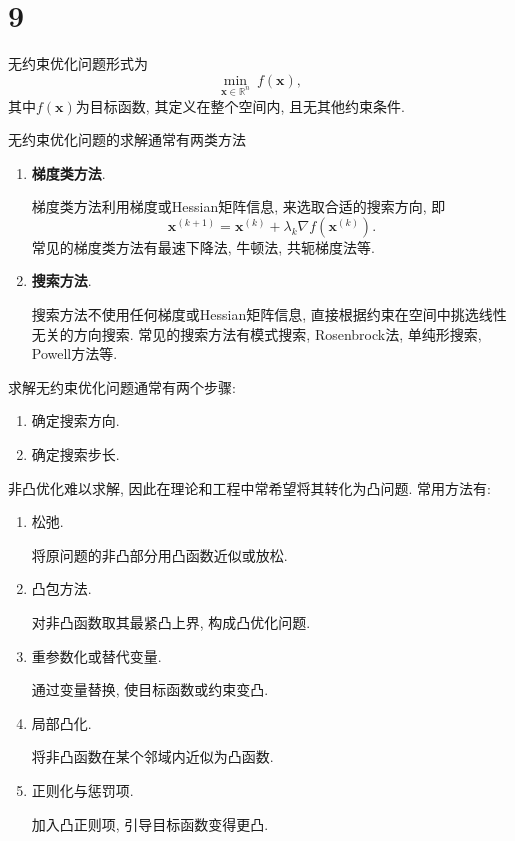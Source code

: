 \section*{9}

无约束优化问题形式为
\begin{equation*}
    \min_{\bm{x}\in\mathbb{R}^n} ~ f(\bm{x}),
\end{equation*}
其中$f(\bm{x})$为目标函数, 其定义在整个空间内, 且无其他约束条件.

无约束优化问题的求解通常有两类方法
\begin{enumerate}
    \item \textbf{梯度类方法}.

        梯度类方法利用梯度或Hessian矩阵信息, 来选取合适的搜索方向, 即
        \begin{equation*}
            \bm{x}^{(k+1)}=\bm{x}^{(k)}+\lambda_k\nabla f\left(\bm{x}^{(k)}\right).
        \end{equation*}
        常见的梯度类方法有最速下降法, 牛顿法, 共轭梯度法等.

    \item \textbf{搜索方法}.

        搜索方法不使用任何梯度或Hessian矩阵信息, 直接根据约束在空间中挑选线性无关的方向搜索.
        常见的搜索方法有模式搜索, Rosenbrock法, 单纯形搜索, Powell方法等.
\end{enumerate}

求解无约束优化问题通常有两个步骤: 
\begin{enumerate}
    \item 确定搜索方向.
    \item 确定搜索步长.
\end{enumerate}

非凸优化难以求解, 因此在理论和工程中常希望将其转化为凸问题. 常用方法有:
\begin{enumerate}
    \item 松弛.

        将原问题的非凸部分用凸函数近似或放松.

    \item 凸包方法.

    对非凸函数取其最紧凸上界, 构成凸优化问题.

    \item 重参数化或替代变量.

        通过变量替换, 使目标函数或约束变凸.

    \item 局部凸化.

        将非凸函数在某个邻域内近似为凸函数.

    \item 正则化与惩罚项.

    加入凸正则项, 引导目标函数变得更凸.
\end{enumerate}

